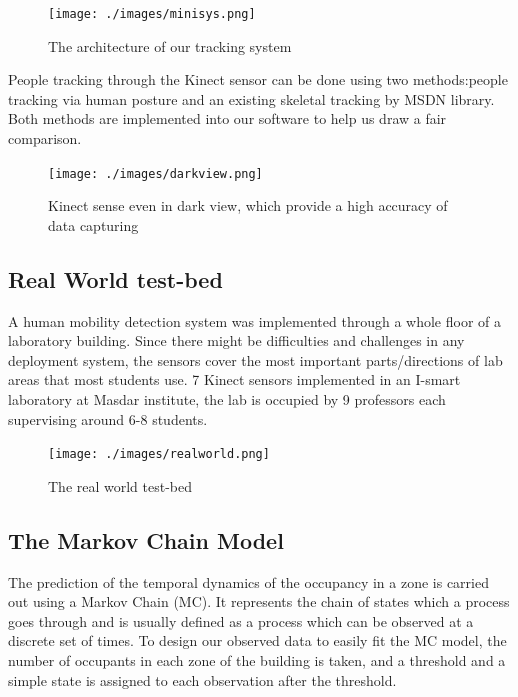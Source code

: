 \begin{figure} [!ht]
  \begin{center}
	  	\texttt{[image: ./images/minisys.png]}
  \end{center}
  \caption{The architecture of our tracking system}\label{fig:minisys}
\end{figure}

People tracking through the Kinect sensor can be done using two methods:people tracking via human posture and an existing skeletal tracking by MSDN library. Both methods are implemented into our software to help us draw a fair comparison.

\begin{figure}[!ht]
  \centering
 	  	\texttt{[image: ./images/darkview.png]}
  \caption{Kinect sense even in dark view, which provide a high accuracy of data capturing}
\end{figure}

\subsection{Real World test-bed}
A human mobility detection system was implemented through a whole floor of a laboratory building. Since there might be difficulties and challenges in any deployment system, the sensors cover the most important parts/directions of lab areas that most students use. 7 Kinect sensors implemented in an I-smart laboratory at Masdar institute, the lab is occupied by 9 professors each supervising around 6-8 students.

\begin{figure} [!ht]
  \begin{center}
	  	\texttt{[image: ./images/realworld.png]}
  \end{center}
  \caption{The real world test-bed }\label{fig:tstbd}
\end{figure} 

\subsection{The Markov Chain Model}
The prediction of the temporal dynamics of the occupancy in a zone is carried out using a Markov Chain (MC).  It represents the chain of states which a process goes through and is usually defined as a process which can be observed at a discrete set of times.  To design our observed data to easily fit the MC model, the number of occupants in each zone of the building is taken, and a threshold and a simple state is assigned to each observation after the threshold.

